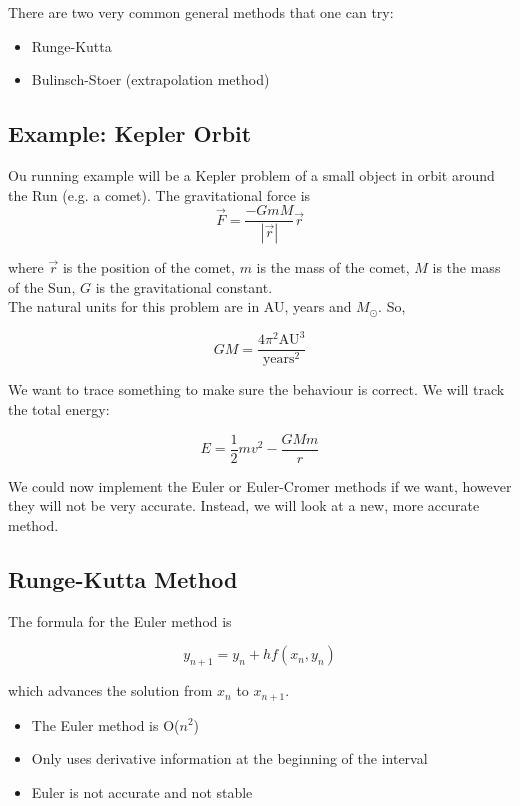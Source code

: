 \documentclass[]{article}
\begin{document}
There are two very common general methods that one can try:

\begin{itemize}
	\item Runge-Kutta
	\item Bulinsch-Stoer (extrapolation method)
\end{itemize}

\subsection{Example: Kepler Orbit}\bigbreak

Ou running example will be a Kepler problem of a small object in orbit around the Run (e.g. a comet). The gravitational force is\\

\[\vec{F} = \frac{-GmM}{|\vec{r}|}\vec{r}\]

where $\vec{r}$ is the position of the comet, $m$ is the mass of the comet, $M$ is the mass of the Sun, $G$ is the gravitational constant.\\

The natural units for this problem are in AU, years and $M_\odot$. So, 

\[ GM = \frac{4\pi^2 \text{AU}^3}{\text{years}^2}\]

We want to trace something to make sure the behaviour is correct. We will track the total energy:

\[ E = \frac{1}{2}mv^2 - \frac{GMm}{r}\]

We could now implement the Euler or Euler-Cromer methods if we want, however they will not be very accurate. Instead, we will look at a new, more accurate method.\\

\subsection{Runge-Kutta Method}\bigbreak

The formula for the Euler method is 

\[y_{n+1} = y_n + hf(x_n, y_n)\]

which advances the solution from $x_n$ to $x_{n+1}$.

\begin{itemize}
	\item The Euler method is O($n^2$)
	\item Only uses derivative information at the beginning of the interval
	\item Euler is not accurate and not stable
\end{itemize}
\end{document}
